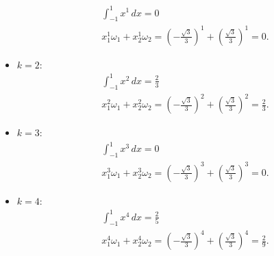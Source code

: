 \begin{ex}
\begin{itemize}
  \begin{subequations}
    \begin{align}
      &\int_{-1}^1 x^1\,dx = 0\\
      &x_1^1\omega_1 + x_2^1\omega_2 = \left(-\frac{\sqrt{3}}{3}\right)^1 + \left(\frac{\sqrt{3}}{3}\right)^1 = 0.
    \end{align}
\end{subequations}
\item $k=2$:
  \begin{subequations}
    \begin{align}
      &\int_{-1}^1 x^2\,dx = \frac{2}{3}\\
      &x_1^2\omega_1 + x_2^2\omega_2 = \left(-\frac{\sqrt{3}}{3}\right)^2 + \left(\frac{\sqrt{3}}{3}\right)^2 = \frac{2}{3}.
    \end{align}
\end{subequations}
\item $k=3$:
  \begin{subequations}
    \begin{align}
      &\int_{-1}^1 x^3\,dx = 0\\
      &x_1^3\omega_1 + x_2^3\omega_2 = \left(-\frac{\sqrt{3}}{3}\right)^3 + \left(\frac{\sqrt{3}}{3}\right)^3 = 0.
    \end{align}
\end{subequations}
\item $k=4$:
  \begin{subequations}
    \begin{align}
      &\int_{-1}^1 x^4\,dx = \frac{2}{5}\\
      &x_1^4\omega_1 + x_2^4\omega_2 = \left(-\frac{\sqrt{3}}{3}\right)^4 + \left(\frac{\sqrt{3}}{3}\right)^4 = \frac{2}{9}.
    \end{align}
\end{subequations}
\end{itemize}
\end{ex}

